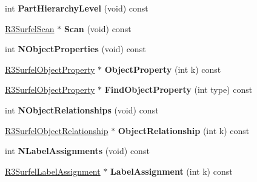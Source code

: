 \begin{DoxyCompactItemize}
\item 
int {\bfseries Part\+Hierarchy\+Level} (void) const \hypertarget{class_r3_surfel_object_ae7046f3e920f5a266e69dd278e096266}{}\label{class_r3_surfel_object_ae7046f3e920f5a266e69dd278e096266}

\item 
\hyperlink{class_r3_surfel_scan}{R3\+Surfel\+Scan} $\ast$ {\bfseries Scan} (void) const \hypertarget{class_r3_surfel_object_ad4586ca8026b40a5d775ad0c553f2a9e}{}\label{class_r3_surfel_object_ad4586ca8026b40a5d775ad0c553f2a9e}

\item 
int {\bfseries N\+Object\+Properties} (void) const \hypertarget{class_r3_surfel_object_a5464594c652c4ea177e275656064f801}{}\label{class_r3_surfel_object_a5464594c652c4ea177e275656064f801}

\item 
\hyperlink{class_r3_surfel_object_property}{R3\+Surfel\+Object\+Property} $\ast$ {\bfseries Object\+Property} (int k) const \hypertarget{class_r3_surfel_object_a9b5baa17ea777446591b3a6c30572351}{}\label{class_r3_surfel_object_a9b5baa17ea777446591b3a6c30572351}

\item 
\hyperlink{class_r3_surfel_object_property}{R3\+Surfel\+Object\+Property} $\ast$ {\bfseries Find\+Object\+Property} (int type) const \hypertarget{class_r3_surfel_object_a8b8c76589eb76ffbc5d86fd739effb9d}{}\label{class_r3_surfel_object_a8b8c76589eb76ffbc5d86fd739effb9d}

\item 
int {\bfseries N\+Object\+Relationships} (void) const \hypertarget{class_r3_surfel_object_ab213e5342cae2e7fc79c9e7e817c1f32}{}\label{class_r3_surfel_object_ab213e5342cae2e7fc79c9e7e817c1f32}

\item 
\hyperlink{class_r3_surfel_object_relationship}{R3\+Surfel\+Object\+Relationship} $\ast$ {\bfseries Object\+Relationship} (int k) const \hypertarget{class_r3_surfel_object_a75d29fb1b3ad3838c31dc72cbbfb7218}{}\label{class_r3_surfel_object_a75d29fb1b3ad3838c31dc72cbbfb7218}

\item 
int {\bfseries N\+Label\+Assignments} (void) const \hypertarget{class_r3_surfel_object_a3972ce2ba4327ea6aeecc11c4b90c6d8}{}\label{class_r3_surfel_object_a3972ce2ba4327ea6aeecc11c4b90c6d8}

\item 
\hyperlink{class_r3_surfel_label_assignment}{R3\+Surfel\+Label\+Assignment} $\ast$ {\bfseries Label\+Assignment} (int k) const \hypertarget{class_r3_surfel_object_a4d04b0c1f0aa661e7180d26608e970ba}{}\label{class_r3_surfel_object_a4d04b0c1f0aa661e7180d26608e970ba}


\end{DoxyCompactItemize}

